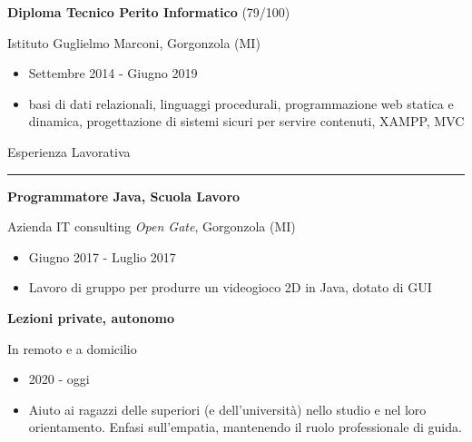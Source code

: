 \documentclass[a4paper]{letter}
\begin{document}
\begin{minipage}[t]{0.65\textwidth}
{\large \textbf{Diploma Tecnico Perito Informatico} \small (79/100)}

{\small Istituto Guglielmo Marconi, Gorgonzola (MI)}
\begin{itemize}
    \item Settembre 2014 - Giugno 2019
    \item basi di dati relazionali, linguaggi procedurali, programmazione web statica e dinamica, progettazione di sistemi sicuri per servire contenuti, XAMPP, MVC
\end{itemize}

\vspace{0.5cm}

{\large Esperienza Lavorativa}
\rule{\linewidth}{0.4pt}

{\large \textbf{Programmatore Java, Scuola Lavoro}}

{\small  Azienda IT consulting \textit{Open Gate}, Gorgonzola (MI)}

\begin{itemize}
    \item Giugno 2017 - Luglio 2017
    \item Lavoro di gruppo per produrre un videogioco 2D in Java, dotato di GUI
\end{itemize}

{\large \textbf{Lezioni private, autonomo}}

{\small In remoto e a domicilio}

\begin{itemize}
    \item 2020 - oggi
    \item Aiuto ai ragazzi delle superiori (e dell'università) nello studio e nel loro orientamento. Enfasi sull'empatia, mantenendo il ruolo professionale di guida.
\end{itemize}

\end{minipage}
\end{document}
